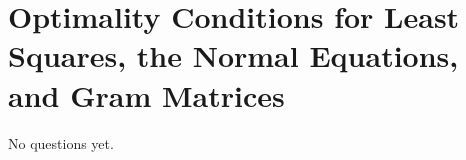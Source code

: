 \chapter{Optimality Conditions for Least Squares, the Normal Equations, and Gram Matrices}

No questions yet.
